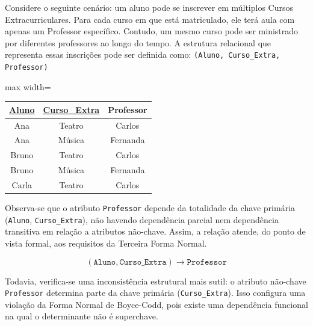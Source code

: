 \begin{tcolorbox}[breakable, colback=blue!5,colframe=blue!40!black,title=Situação exemplo]

Considere o seguinte cenário: um aluno pode se inscrever em múltiplos Cursos Extracurriculares. Para cada curso em que está matriculado, ele terá aula com apenas um Professor específico. Contudo, um mesmo curso pode ser ministrado por diferentes professores ao longo do tempo. A estrutura relacional que representa essas inscrições pode ser definida como: \texttt{(Aluno, Curso\_Extra, Professor)}

\vspace{0.4cm}

\centering
\renewcommand{\arraystretch}{1.2}

\begin{adjustbox}{max width=\textwidth}
\begin{tabular}{|c|c|c|}
\hline
\textbf{\underline{Aluno}} & \textbf{\underline{Curso\_Extra}} & \textbf{Professor} \\ \hline
Ana & Teatro & Carlos \\ \hline
Ana & Música & Fernanda \\ \hline
Bruno & Teatro & Carlos \\ \hline
Bruno & Música & Fernanda \\ \hline
Carla & Teatro & Carlos \\ \hline
\end{tabular}
\end{adjustbox}
\vspace{0.3cm}
\label{tab:bcnf_exemplo}

\vspace{0.4cm}

\justify

Observa-se que o atributo \texttt{Professor} depende da totalidade da chave primária (\texttt{Aluno}, \texttt{Curso\_Extra}), não havendo dependência parcial nem dependência transitiva em relação a atributos não-chave. Assim, a relação atende, do ponto de vista formal, aos requisitos da Terceira Forma Normal.

\[
(\texttt{Aluno}, \texttt{Curso\_Extra}) \rightarrow \texttt{Professor}
\]

Todavia, verifica-se uma inconsistência estrutural mais sutil: o atributo não-chave \texttt{Professor} determina parte da chave primária (\texttt{Curso\_Extra}). Isso configura uma violação da Forma Normal de Boyce-Codd, pois existe uma dependência funcional na qual o determinante não é superchave.


\end{tcolorbox}
